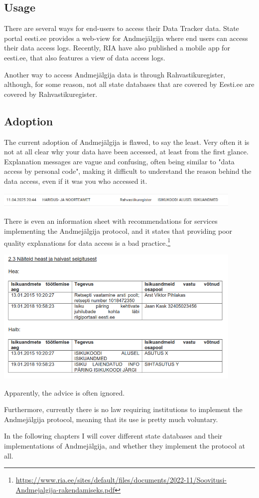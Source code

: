 \subsection{Usage}
There are several ways for end-users to access their Data Tracker data. State portal eesti.ee provides a web-view for Andmejälgija where end users can access their data access logs. Recently, RIA have also published a mobile app for eesti.ee, that also features a view of data access logs. 

Another way to access Andmejälgija data is through Rahvastikuregister, although, for some reason, not all state databases that are covered by Eesti.ee are covered by Rahvastikuregister.



\subsection{Adoption}
The current adoption of Andmejälgija is flawed, to say the least. Very often it is not at all clear why your data have been accessed, at least from the first glance. Explanation messages are vague and confusing, often being similar to "data access by personal code", making it difficult to understand the reason behind the data access, even if it was you who accessed it.

\includegraphics[width=450px]{english/figures/bad_aj_desc.png}

There is even an information sheet with recommendations for services implementing the Andmejälgija protocol, and it states that providing poor quality explanations for data access is a bad practice.\footnote{\url{https://www.ria.ee/sites/default/files/documents/2022-11/Soovitusi-Andmejalgija-rakendamiseks.pdf}} 

\includegraphics[width=450px]{english/figures/aj_good_and_bad_practices.png}

Apparently, the advice is often ignored.

Furthermore, currently there is no law requiring institutions to implement the Andmejälgija protocol, meaning that its use is pretty much voluntary.

In the following chapters I will cover different state databases and their implementations of Andmejälgija, and whether they implement the protocol at all.
